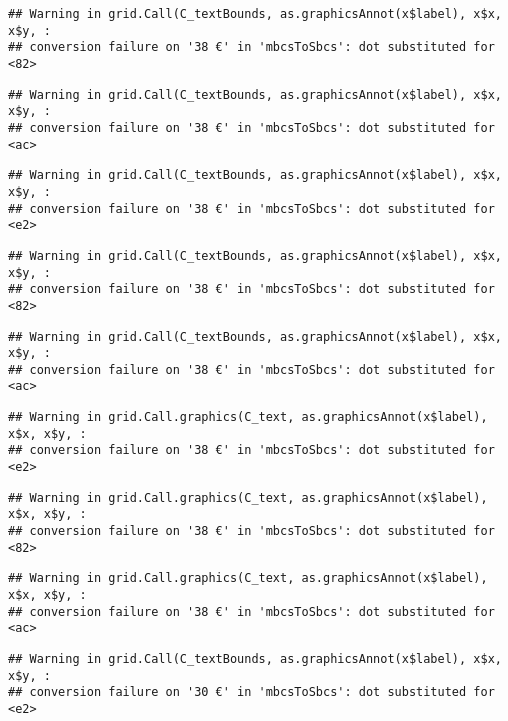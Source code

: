 \documentclass[
]{article}
\begin{document}
\begin{verbatim}
## Warning in grid.Call(C_textBounds, as.graphicsAnnot(x$label), x$x, x$y, :
## conversion failure on '38 €' in 'mbcsToSbcs': dot substituted for <82>
\end{verbatim}

\begin{verbatim}
## Warning in grid.Call(C_textBounds, as.graphicsAnnot(x$label), x$x, x$y, :
## conversion failure on '38 €' in 'mbcsToSbcs': dot substituted for <ac>
\end{verbatim}

\begin{verbatim}
## Warning in grid.Call(C_textBounds, as.graphicsAnnot(x$label), x$x, x$y, :
## conversion failure on '38 €' in 'mbcsToSbcs': dot substituted for <e2>
\end{verbatim}

\begin{verbatim}
## Warning in grid.Call(C_textBounds, as.graphicsAnnot(x$label), x$x, x$y, :
## conversion failure on '38 €' in 'mbcsToSbcs': dot substituted for <82>
\end{verbatim}

\begin{verbatim}
## Warning in grid.Call(C_textBounds, as.graphicsAnnot(x$label), x$x, x$y, :
## conversion failure on '38 €' in 'mbcsToSbcs': dot substituted for <ac>
\end{verbatim}

\begin{verbatim}
## Warning in grid.Call.graphics(C_text, as.graphicsAnnot(x$label), x$x, x$y, :
## conversion failure on '38 €' in 'mbcsToSbcs': dot substituted for <e2>
\end{verbatim}

\begin{verbatim}
## Warning in grid.Call.graphics(C_text, as.graphicsAnnot(x$label), x$x, x$y, :
## conversion failure on '38 €' in 'mbcsToSbcs': dot substituted for <82>
\end{verbatim}

\begin{verbatim}
## Warning in grid.Call.graphics(C_text, as.graphicsAnnot(x$label), x$x, x$y, :
## conversion failure on '38 €' in 'mbcsToSbcs': dot substituted for <ac>
\end{verbatim}

\begin{verbatim}
## Warning in grid.Call(C_textBounds, as.graphicsAnnot(x$label), x$x, x$y, :
## conversion failure on '30 €' in 'mbcsToSbcs': dot substituted for <e2>
\end{verbatim}
\end{document}
